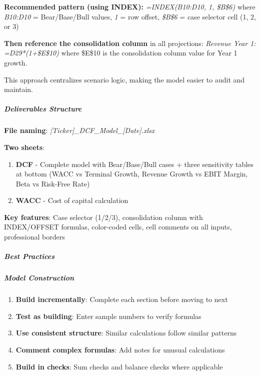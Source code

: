 \documentclass[11pt]{article}
\begin{document}
\textbf{Recommended pattern (using INDEX):} \emph{=INDEX(B10:D10, 1, \$B\$6)} where \emph{B10:D10} = Bear/Base/Bull values, \emph{1} = row offset, \emph{\$B\$6} = case selector cell (1, 2, or 3)


\textbf{Then reference the consolidation column} in all projections: \emph{Revenue Year 1: =D29*(1+\$E\$10)} where \$E\$10 is the consolidation column value for Year 1 growth.


This approach centralizes scenario logic, making the model easier to audit and maintain.


\subparagraph{Deliverables Structure}\mbox{}\par

\textbf{File naming}: \emph{[Ticker]\_\allowbreak{}DCF\_\allowbreak{}Model\_\allowbreak{}[Date].xlsx}


\textbf{Two sheets}:

\begin{enumerate}[leftmargin=*,itemsep=2pt,topsep=2pt]
\item {} \textbf{DCF} - Complete model with Bear/Base/Bull cases + three sensitivity tables at bottom (WACC vs Terminal Growth, Revenue Growth vs EBIT Margin, Beta vs Risk-Free Rate)
\item {} \textbf{WACC} - Cost of capital calculation
\end{enumerate}

\textbf{Key features}: Case selector (1/2/3), consolidation column with INDEX/OFFSET formulas, color-coded cells, cell comments on all inputs, professional borders


\subparagraph{Best Practices}\mbox{}\par

\subparagraph{Model Construction}\mbox{}\par
\begin{enumerate}[leftmargin=*,itemsep=2pt,topsep=2pt]
\item {} \textbf{Build incrementally}: Complete each section before moving to next
\item {} \textbf{Test as building}: Enter sample numbers to verify formulas
\item {} \textbf{Use consistent structure}: Similar calculations follow similar patterns
\item {} \textbf{Comment complex formulas}: Add notes for unusual calculations
\item {} \textbf{Build in checks}: Sum checks and balance checks where applicable
\end{enumerate}
\end{document}
